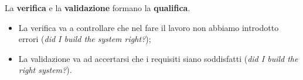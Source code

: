 La \textbf{verifica} e la \textbf{validazione} formano la \textbf{qualifica}.

\begin{itemize}

	\item La verifica va a controllare che nel fare il lavoro non abbiamo introdotto errori (\textit{did I build the system right?});
	\item La validazione va ad accertarsi che i requisiti siano soddisfatti (\textit{did I build the right system?}).

\end{itemize}

